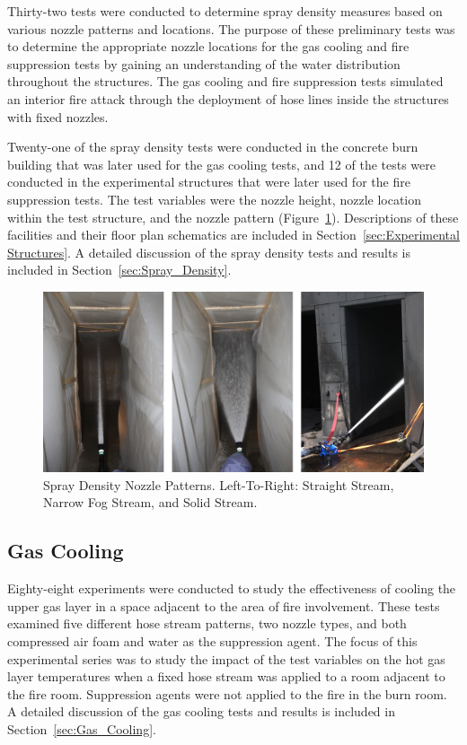 \documentclass[12pt,oneside]{book}
\begin{document}
Thirty-two tests were conducted to determine spray density measures based on various nozzle patterns and locations. The purpose of these preliminary tests was to determine the appropriate nozzle locations for the gas cooling and fire suppression tests by gaining an understanding of the water distribution throughout the structures. The gas cooling and fire suppression tests simulated an interior fire attack through the deployment of hose lines inside the structures with fixed nozzles.

Twenty-one of the spray density tests were conducted in the concrete burn building that was later used for the gas cooling tests, and 12 of the tests were conducted in the experimental structures that were later used for the fire suppression tests. The test variables were the nozzle height, nozzle location within the test structure, and the nozzle pattern (Figure~\ref{fig:Spray_Density_Nozzle_Patterns}). Descriptions of these facilities and their floor plan schematics are included in Section~\ref{sec:Experimental Structures}. A detailed discussion of the spray density tests and results is included in Section~\ref{sec:Spray_Density}.

\begin{figure}[!ht]
	\includegraphics[width=6in]{../Figures/Pictures/Flows}
	\caption[Spray Density Nozzle Patterns]{Spray Density Nozzle Patterns. Left-To-Right: Straight Stream, Narrow Fog Stream, and Solid Stream.}
	\label{fig:Spray_Density_Nozzle_Patterns}
\end{figure}

\subsection{Gas Cooling}
\label{sec:desc_Gas_Cooling}

Eighty-eight experiments were conducted to study the effectiveness of cooling the upper gas layer in a space adjacent to the area of fire involvement. These tests examined five different hose stream patterns, two nozzle types, and both compressed air foam and water as the suppression agent. The focus of this experimental series was to study the impact of the test variables on the hot gas layer temperatures when a fixed hose stream was applied to a room adjacent to the fire room. Suppression agents were not applied to the fire in the burn room. A detailed discussion of the gas cooling tests and results is included in Section~\ref{sec:Gas_Cooling}.
\end{document}
